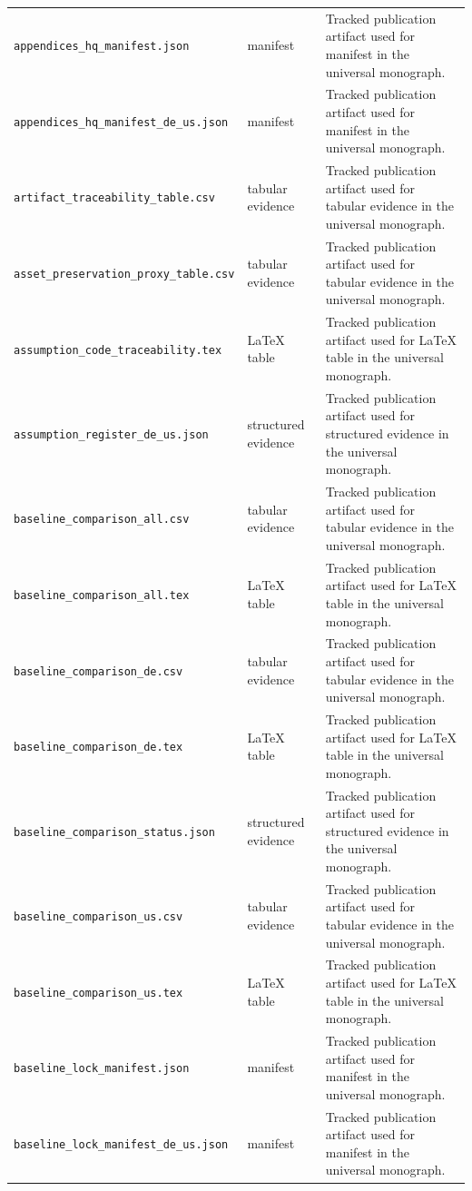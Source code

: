 \begin{longtable}{p{}p{}p{}}
\texttt{appendices\_hq\_manifest.json} & manifest & Tracked publication artifact used for manifest in the universal monograph.\\
\texttt{appendices\_hq\_manifest\_de\_us.json} & manifest & Tracked publication artifact used for manifest in the universal monograph.\\
\texttt{artifact\_traceability\_table.csv} & tabular evidence & Tracked publication artifact used for tabular evidence in the universal monograph.\\
\texttt{asset\_preservation\_proxy\_table.csv} & tabular evidence & Tracked publication artifact used for tabular evidence in the universal monograph.\\
\texttt{assumption\_code\_traceability.tex} & LaTeX table & Tracked publication artifact used for LaTeX table in the universal monograph.\\
\texttt{assumption\_register\_de\_us.json} & structured evidence & Tracked publication artifact used for structured evidence in the universal monograph.\\
\texttt{baseline\_comparison\_all.csv} & tabular evidence & Tracked publication artifact used for tabular evidence in the universal monograph.\\
\texttt{baseline\_comparison\_all.tex} & LaTeX table & Tracked publication artifact used for LaTeX table in the universal monograph.\\
\texttt{baseline\_comparison\_de.csv} & tabular evidence & Tracked publication artifact used for tabular evidence in the universal monograph.\\
\texttt{baseline\_comparison\_de.tex} & LaTeX table & Tracked publication artifact used for LaTeX table in the universal monograph.\\
\texttt{baseline\_comparison\_status.json} & structured evidence & Tracked publication artifact used for structured evidence in the universal monograph.\\
\texttt{baseline\_comparison\_us.csv} & tabular evidence & Tracked publication artifact used for tabular evidence in the universal monograph.\\
\texttt{baseline\_comparison\_us.tex} & LaTeX table & Tracked publication artifact used for LaTeX table in the universal monograph.\\
\texttt{baseline\_lock\_manifest.json} & manifest & Tracked publication artifact used for manifest in the universal monograph.\\
\texttt{baseline\_lock\_manifest\_de\_us.json} & manifest & Tracked publication artifact used for manifest in the universal monograph.\\

\end{longtable}
